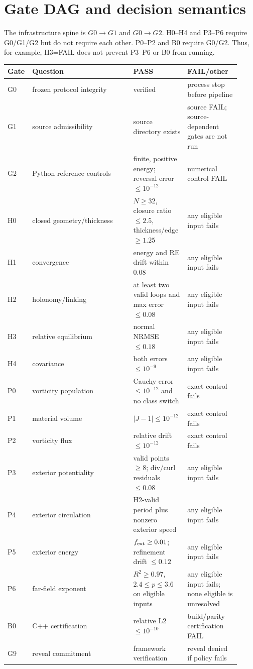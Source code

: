 \documentclass[11pt,a4paper]{article}
\begin{document}
\section{Gate DAG and decision semantics}
The infrastructure spine is $G0\rightarrow G1$ and $G0\rightarrow G2$. H0--H4 and P3--P6 require G0/G1/G2 but do not require each other. P0--P2 and B0 require G0/G2. Thus, for example, H3=FAIL does not prevent P3--P6 or B0 from running.

\begin{longtable}{p{0.08\linewidth}p{0.42\linewidth}p{0.20\linewidth}p{0.22\linewidth}}
\toprule
Gate & Question & PASS & FAIL/other \\
\midrule
G0 & frozen protocol integrity & verified & process stop before pipeline \\
G1 & source admissibility & source directory exists & source FAIL; source-dependent gates are not run \\
G2 & Python reference controls & finite, positive energy; reversal error $\le10^{-12}$ & numerical control FAIL \\
H0 & closed geometry/thickness & $N\ge32$, closure ratio $\le2.5$, thickness/edge $\ge1.25$ & any eligible input fails \\
H1 & convergence & energy and RE drift within 0.08 & any eligible input fails \\
H2 & holonomy/linking & at least two valid loops and max error $\le0.08$ & any eligible input fails \\
H3 & relative equilibrium & normal NRMSE $\le0.18$ & any eligible input fails \\
H4 & covariance & both errors $\le10^{-9}$ & any eligible input fails \\
P0 & vorticity population & Cauchy error $\le10^{-12}$ and no class switch & exact control fails \\
P1 & material volume & $|J-1|\le10^{-12}$ & exact control fails \\
P2 & vorticity flux & relative drift $\le10^{-12}$ & exact control fails \\
P3 & exterior potentiality & valid points $\ge8$; div/curl residuals $\le0.08$ & any eligible input fails \\
P4 & exterior circulation & H2-valid period plus nonzero exterior speed & any eligible input fails \\
P5 & exterior energy & $f_{\rm ext}\ge0.01$; refinement drift $\le0.12$ & any eligible input fails \\
P6 & far-field exponent & $R^2\ge0.97$, $2.4\le p\le3.6$ on eligible inputs & any eligible input fails; none eligible is unresolved \\
B0 & C++ certification & relative L2 $\le10^{-10}$ & build/parity certification FAIL \\
G9 & reveal commitment & framework verification & reveal denied if policy fails \\
\bottomrule
\end{longtable}
\end{document}
